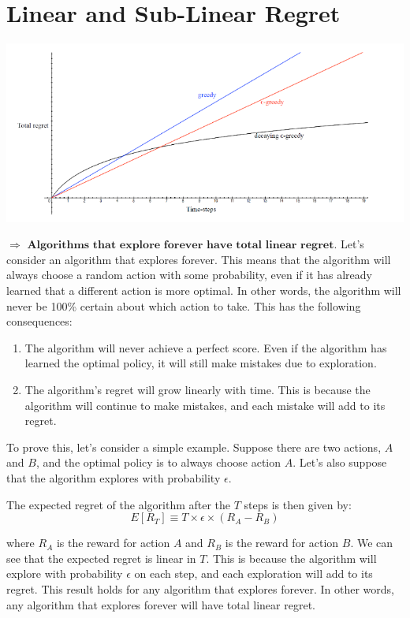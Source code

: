 \documentclass{article}
\begin{document}
\section{Linear and Sub-Linear Regret}
\begin{center}
    \includegraphics{pic1.png}
\end{center}

$\Rightarrow$ $\textbf{Algorithms that explore forever have total linear regret}.$ 
Let's consider an algorithm that explores forever. This means that the algorithm will always choose a random action with some probability, even if it has already learned that a different action is more optimal. In other words, the algorithm will never be 100\% certain about which action to take.
This has the following consequences:

\begin{enumerate}
    \item The algorithm will never achieve a perfect score. Even if the algorithm has learned the optimal policy, it will still make mistakes due to exploration.
    \item The algorithm's regret will grow linearly with time. This is because the algorithm will continue to make mistakes, and each mistake will add to its regret.
\end{enumerate}

To prove this, let's consider a simple example. Suppose there are two actions, $A$ and $B$, and the optimal policy is to always choose action $A$. Let's also suppose that the algorithm explores with probability $\epsilon$.

The expected regret of the algorithm after the $T$ steps is then given by:
\begin{equation} \label{eu_eqn}
E[R_{T}]\equiv T \times \epsilon \times (R_{A}-R_{B})
\end{equation}


where $R_A$ is the reward for action $A$ and $R_B$ is the reward for action $B$. We can see that the expected regret is linear in $T$. This is because the algorithm will explore with probability $\epsilon$ on each step, and each exploration will add to its regret. This result holds for any algorithm that explores forever. In other words, any algorithm that explores forever will have total linear regret.
\end{document}
